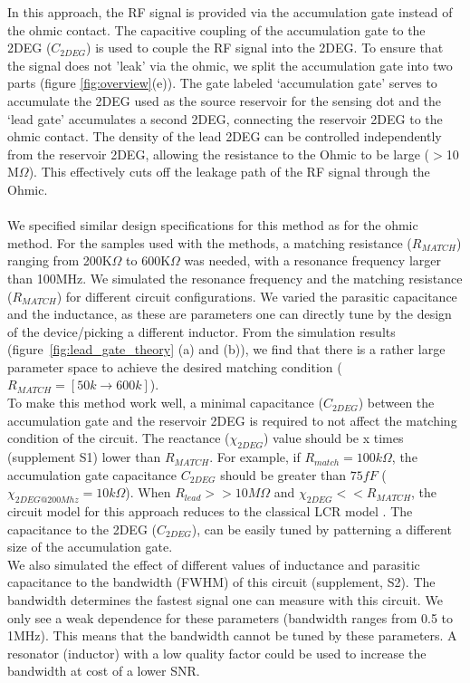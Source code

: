 \documentclass{article}
\begin{document}
	In this approach, the RF signal is provided via the accumulation gate\cite{Volk2019} instead of the ohmic contact. The capacitive coupling of the accumulation gate to the 2DEG ($C_{2DEG}$) is used to couple the RF signal into the 2DEG. To ensure that the signal does not 'leak' via the ohmic, we  split the accumulation gate into two parts (figure \ref{fig:overview}(e)).
	The gate labeled ‘accumulation gate’ serves to accumulate the 2DEG used as the source reservoir for the sensing dot and the ‘lead gate’ accumulates a second 2DEG, connecting the reservoir 2DEG to the ohmic contact. The density of the lead 2DEG can be controlled independently from the reservoir 2DEG, allowing the resistance to the Ohmic to be large ($>$10 M$\Omega$). This effectively cuts off the leakage path of the RF signal through the Ohmic.
	\\ \\
	We specified similar design specifications for this method as for the ohmic method. For the samples used with the methods, a matching resistance ($R_{MATCH}$) ranging from 200K$\Omega$ to 600K$\Omega$ was needed, with a resonance frequency larger than 100MHz. We simulated the resonance frequency and the matching resistance ($R_{MATCH}$) for different circuit configurations. We varied the parasitic capacitance and the inductance, as these are parameters one can directly tune by the design of the device/picking a different inductor. From the simulation results (figure\ \ref{fig:lead_gate_theory} (a) and (b)), we find that there is a rather large parameter space to achieve the desired matching condition ($R_{MATCH} = [50k \rightarrow 600k]$).
	\\
	To make this method work well, a minimal capacitance ($C_{2DEG}$) between the accumulation gate and the reservoir 2DEG is required to not affect the matching condition of the circuit. The reactance ($\chi_{2DEG}$) value should be x times (supplement S1) lower than $R_{MATCH}$. For example, if $R_{match}=100k\Omega$, the accumulation gate capacitance $C_{2DEG}$ should be greater than $75fF$ ($\chi_{2DEG@200 Mhz} = 10k\Omega$). When $R_{lead} >> 10M\Omega$ and $\chi_{2DEG} << R_{MATCH}$, the circuit model for this approach reduces to the classical LCR model
	\cite{taskinen2008radio}. The capacitance to the 2DEG ($C_{2DEG}$), can be easily tuned by patterning a different size of the accumulation gate.
	\\
	We also simulated the effect of different values of inductance and parasitic capacitance to the bandwidth (FWHM) of this circuit (supplement, S2). The bandwidth determines the fastest signal one can measure with this circuit. We only see a weak dependence for these parameters (bandwidth ranges from 0.5 to 1MHz). This means that the bandwidth cannot be tuned by these parameters. A resonator (inductor) with a low quality factor could be used to increase the bandwidth at cost of a lower SNR.
\end{document}
